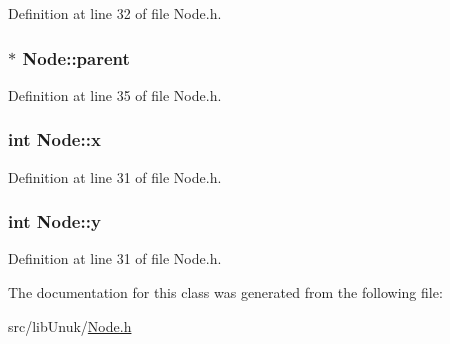 Definition at line 32 of file Node.h.

\hypertarget{class_node_ad8184598cdea70e4bbdfd76f2b0f9e85}{
\subsubsection[{parent}]{$\ast$ {\bf Node::parent}}}
\label{class_node_ad8184598cdea70e4bbdfd76f2b0f9e85}


Definition at line 35 of file Node.h.

\hypertarget{class_node_aff1029a518bdc2651007b8856f958364}{
\subsubsection[{x}]{\setlength{\rightskip}{0pt plus 5cm}int {\bf Node::x}}}
\label{class_node_aff1029a518bdc2651007b8856f958364}


Definition at line 31 of file Node.h.

\hypertarget{class_node_aa3e5b5240023b4528ae85057b3324202}{
\subsubsection[{y}]{\setlength{\rightskip}{0pt plus 5cm}int {\bf Node::y}}}
\label{class_node_aa3e5b5240023b4528ae85057b3324202}


Definition at line 31 of file Node.h.



The documentation for this class was generated from the following file:\begin{DoxyCompactItemize}
\item 
src/libUnuk/\hyperlink{_node_8h}{Node.h}\end{DoxyCompactItemize}
